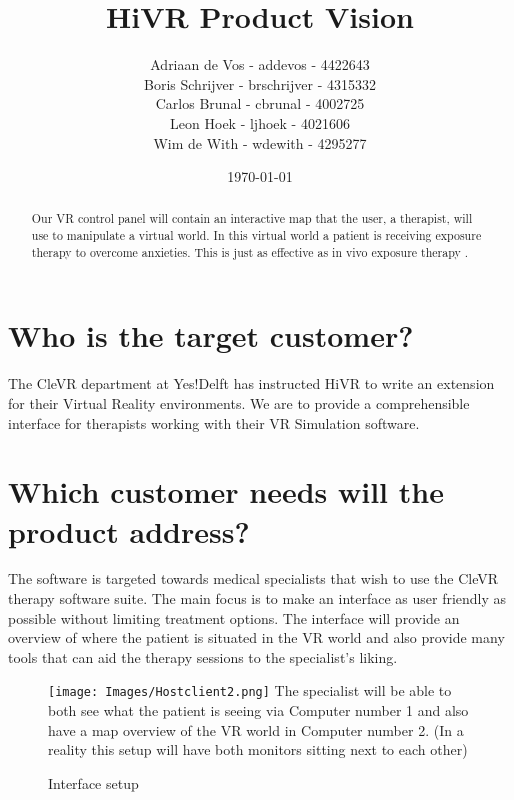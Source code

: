 \documentclass[11pt]{article}
\begin{document}
\title{HiVR Product Vision}
\author{
	Adriaan de Vos - addevos - 4422643\\
	Boris Schrijver - brschrijver - 4315332\\
	Carlos Brunal - cbrunal - 4002725\\
	Leon Hoek - ljhoek - 4021606\\
	Wim de With - wdewith - 4295277
}
\date{\today}

\maketitle

\begin{abstract}
   Our VR control panel will contain an interactive map that the user, a therapist, will use to manipulate a virtual world. In this virtual world a patient is receiving exposure therapy to  overcome anxieties. This is just as effective as in vivo exposure therapy \cite{virtualvsrealtrial}.
\end{abstract}
\newpage
\tableofcontents
\newpage

\section{Who is the target customer?}
	The CleVR department at Yes!Delft has instructed HiVR to write an extension for their Virtual Reality environments.
    We are to provide a comprehensible interface for therapists working with their VR Simulation software.
   
\section{Which customer needs will the product address?}
The software is targeted towards medical specialists that wish to use the CleVR therapy software suite. The main focus is to make an interface as user friendly as possible without limiting treatment options. The interface will provide an overview of where the patient is situated in the VR world and also provide many tools that can aid the therapy sessions to the specialist's liking.
\begin{figure}[h]
	\caption{Interface setup}
	\texttt{[image: Images/Hostclient2.png]}
    The specialist will be able to both see what the patient is seeing via Computer number 1 and also have a map overview of the VR world in Computer number 2. (In a reality this setup will have both monitors sitting next to each other)
\end{figure}
\end{document}
